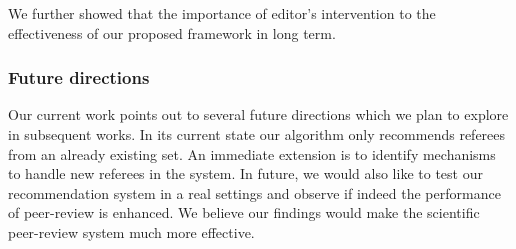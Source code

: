 We further showed that the importance of editor's intervention to the effectiveness of our  proposed framework in long term. 
\subsubsection{Future directions}
Our current work points out to several future directions which we plan to explore in subsequent works. In its current state our algorithm only recommends referees from an already existing set. An immediate extension is to identify mechanisms to handle new referees in the system. In future, we would also like to test our recommendation system in a real settings and observe if indeed the performance of peer-review is enhanced. We believe our findings would make the scientific peer-review system much more effective.
\fi

\medskip

